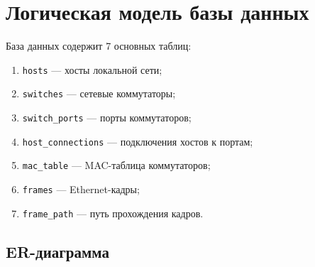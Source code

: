 \documentclass[12pt,a4paper]{article}
\begin{document}
\section{Логическая модель базы данных}

База данных содержит 7 основных таблиц:
\begin{enumerate}
    \item \texttt{hosts} --- хосты локальной сети;
    \item \texttt{switches} --- сетевые коммутаторы;
    \item \texttt{switch\_ports} --- порты коммутаторов;
    \item \texttt{host\_connections} --- подключения хостов к портам;
    \item \texttt{mac\_table} --- MAC-таблица коммутаторов;
    \item \texttt{frames} --- Ethernet-кадры;
    \item \texttt{frame\_path} --- путь прохождения кадров.
\end{enumerate}

\subsection{ER-диаграмма}
\end{document}
